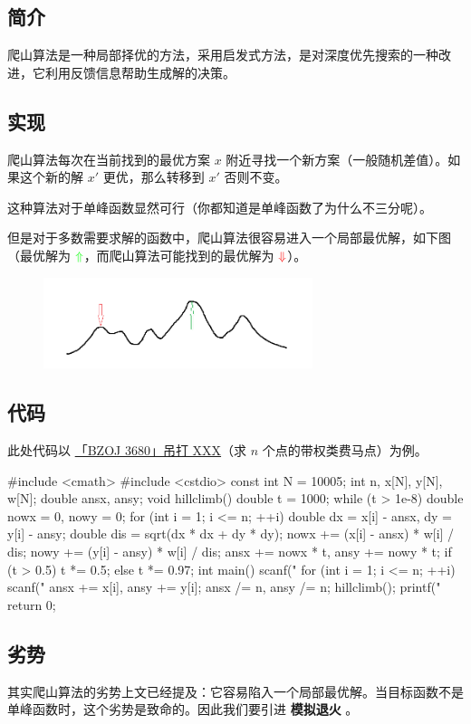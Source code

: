 
\subsection{简介}

爬山算法是一种局部择优的方法，采用启发式方法，是对深度优先搜索的一种改进，它利用反馈信息帮助生成解的决策。

\hr

\subsection{实现}

爬山算法每次在当前找到的最优方案 $x$ 附近寻找一个新方案（一般随机差值）。如果这个新的解 $x'$ 更优，那么转移到 $x'$ 否则不变。

这种算法对于单峰函数显然可行（你都知道是单峰函数了为什么不三分呢）。

但是对于多数需要求解的函数中，爬山算法很容易进入一个局部最优解，如下图（最优解为 $\color{green}{\Uparrow}$，而爬山算法可能找到的最优解为 $\color{red}{\Downarrow}$）。

\begin{figure}[htbp]
\centering
\includegraphics[width=0.7\textwidth]{docs/misc/images/hill-climbing.png} 

\end{figure}

\hr

\subsection{代码}

此处代码以 \href{https://www.lydsy.com/JudgeOnline/problem.php?id=3680}{「BZOJ 3680」吊打 XXX}（求 $n$ 个点的带权类费马点）为例。

\begin{cppcode}
#include <cmath>
#include <cstdio>
const int N = 10005;
int n, x[N], y[N], w[N];
double ansx, ansy;
void hillclimb() {
  double t = 1000;
  while (t > 1e-8) {
    double nowx = 0, nowy = 0;
    for (int i = 1; i <= n; ++i) {
      double dx = x[i] - ansx, dy = y[i] - ansy;
      double dis = sqrt(dx * dx + dy * dy);
      nowx += (x[i] - ansx) * w[i] / dis;
      nowy += (y[i] - ansy) * w[i] / dis;
    }
    ansx += nowx * t, ansy += nowy * t;
    if (t > 0.5)
      t *= 0.5;
    else
      t *= 0.97;
  }
}
int main() {
  scanf("%
  for (int i = 1; i <= n; ++i) {
    scanf("%
    ansx += x[i], ansy += y[i];
  }
  ansx /= n, ansy /= n;
  hillclimb();
  printf("%
  return 0;
}
\end{cppcode}

\hr

\subsection{劣势}

其实爬山算法的劣势上文已经提及：它容易陷入一个局部最优解。当目标函数不是单峰函数时，这个劣势是致命的。因此我们要引进  \textbf{模拟退火} 。
